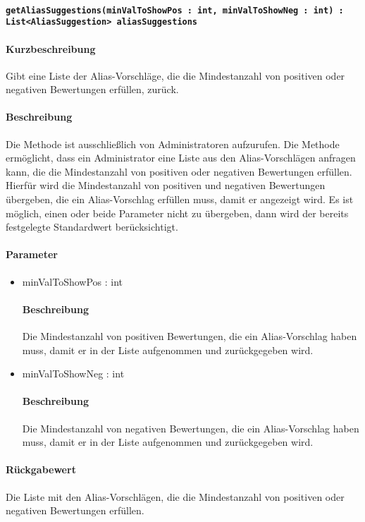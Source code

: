 \paragraph{\texttt{getAliasSuggestions(minValToShowPos : int, minValToShowNeg : int) : List<AliasSuggestion> aliasSuggestions}}%
\paragraph*{Kurzbeschreibung}
Gibt eine Liste der Alias-Vorschläge, die die Mindestanzahl von positiven oder negativen Bewertungen erfüllen, zurück.
\paragraph*{Beschreibung}
Die Methode ist ausschließlich von Administratoren aufzurufen.
Die Methode ermöglicht, dass ein Administrator eine Liste aus den Alias-Vorschlägen anfragen kann, die die Mindestanzahl von positiven oder negativen Bewertungen erfüllen.
Hierfür wird die Mindestanzahl von positiven und negativen Bewertungen übergeben, die ein Alias-Vorschlag erfüllen muss, damit er angezeigt wird.
Es ist möglich, einen oder beide Parameter nicht zu übergeben, dann wird der bereits festgelegte Standardwert berücksichtigt.
\paragraph*{Parameter}
\begin{itemize}
	\item minValToShowPos : int
		\paragraph*{Beschreibung}
		Die Mindestanzahl von positiven Bewertungen, die ein Alias-Vorschlag haben muss, damit er in der Liste aufgenommen und zurückgegeben wird.
	\item minValToShowNeg : int
		\paragraph*{Beschreibung}
		Die Mindestanzahl von negativen Bewertungen, die ein Alias-Vorschlag haben muss, damit er in der Liste aufgenommen und zurückgegeben wird.
\end{itemize}
\paragraph*{Rückgabewert}
Die Liste mit den Alias-Vorschlägen, die die Mindestanzahl von positiven oder negativen Bewertungen erfüllen.
